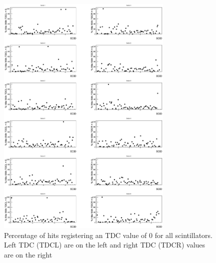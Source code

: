 \begin{figure}\begin{center}
    \includegraphics[width=0.75\textwidth]{figures/calib/tof/tofko/tdc.eps}
    \caption{\label{plt:tdc0vSCID}Percentage of hits registering an TDC value of 0 for all scintillators. Left TDC (TDCL) are on the left and right TDC (TDCR) values are on the right}
\end{center}\end{figure}

